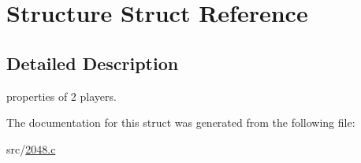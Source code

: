 \hypertarget{structStructure}{\section{Structure Struct Reference}
\label{structStructure}
}


\subsection{Detailed Description}
properties of 2 players. 

The documentation for this struct was generated from the following file\+:\begin{DoxyCompactItemize}
\item 
src/\hyperlink{2048_8c}{2048.\+c}\end{DoxyCompactItemize}
